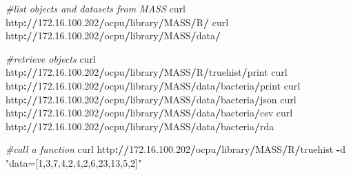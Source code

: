 \documentclass[]{book}
\newenvironment{Shaded}{\begin{snugshade}}{\end{snugshade}}
\newcommand{\FloatTok}[1]{\textcolor[rgb]{0.00,0.00,0.81}{#1}}
\newcommand{\StringTok}[1]{\textcolor[rgb]{0.31,0.60,0.02}{#1}}
\newcommand{\CommentTok}[1]{\textcolor[rgb]{0.56,0.35,0.01}{\textit{#1}}}
\newcommand{\OperatorTok}[1]{\textcolor[rgb]{0.81,0.36,0.00}{\textbf{#1}}}
\newcommand{\ErrorTok}[1]{\textcolor[rgb]{0.64,0.00,0.00}{\textbf{#1}}}
\newcommand{\NormalTok}[1]{#1}
\begin{document}
\begin{Shaded}
\begin{Highlighting}[]
\CommentTok{#list objects and datasets from MASS}
\NormalTok{curl http}\OperatorTok{:}\ErrorTok{//}\FloatTok{172.16}\NormalTok{.}\FloatTok{100.202}\OperatorTok{/}\NormalTok{ocpu}\OperatorTok{/}\NormalTok{library}\OperatorTok{/}\NormalTok{MASS}\OperatorTok{/}\NormalTok{R}\OperatorTok{/}
\NormalTok{curl http}\OperatorTok{:}\ErrorTok{//}\FloatTok{172.16}\NormalTok{.}\FloatTok{100.202}\OperatorTok{/}\NormalTok{ocpu}\OperatorTok{/}\NormalTok{library}\OperatorTok{/}\NormalTok{MASS}\OperatorTok{/}\NormalTok{data}\OperatorTok{/}

\CommentTok{#retrieve objects}
\NormalTok{curl http}\OperatorTok{:}\ErrorTok{//}\FloatTok{172.16}\NormalTok{.}\FloatTok{100.202}\OperatorTok{/}\NormalTok{ocpu}\OperatorTok{/}\NormalTok{library}\OperatorTok{/}\NormalTok{MASS}\OperatorTok{/}\NormalTok{R}\OperatorTok{/}\NormalTok{truehist}\OperatorTok{/}\NormalTok{print}
\NormalTok{curl http}\OperatorTok{:}\ErrorTok{//}\FloatTok{172.16}\NormalTok{.}\FloatTok{100.202}\OperatorTok{/}\NormalTok{ocpu}\OperatorTok{/}\NormalTok{library}\OperatorTok{/}\NormalTok{MASS}\OperatorTok{/}\NormalTok{data}\OperatorTok{/}\NormalTok{bacteria}\OperatorTok{/}\NormalTok{print}
\NormalTok{curl http}\OperatorTok{:}\ErrorTok{//}\FloatTok{172.16}\NormalTok{.}\FloatTok{100.202}\OperatorTok{/}\NormalTok{ocpu}\OperatorTok{/}\NormalTok{library}\OperatorTok{/}\NormalTok{MASS}\OperatorTok{/}\NormalTok{data}\OperatorTok{/}\NormalTok{bacteria}\OperatorTok{/}\NormalTok{json}
\NormalTok{curl http}\OperatorTok{:}\ErrorTok{//}\FloatTok{172.16}\NormalTok{.}\FloatTok{100.202}\OperatorTok{/}\NormalTok{ocpu}\OperatorTok{/}\NormalTok{library}\OperatorTok{/}\NormalTok{MASS}\OperatorTok{/}\NormalTok{data}\OperatorTok{/}\NormalTok{bacteria}\OperatorTok{/}\NormalTok{csv}
\NormalTok{curl http}\OperatorTok{:}\ErrorTok{//}\FloatTok{172.16}\NormalTok{.}\FloatTok{100.202}\OperatorTok{/}\NormalTok{ocpu}\OperatorTok{/}\NormalTok{library}\OperatorTok{/}\NormalTok{MASS}\OperatorTok{/}\NormalTok{data}\OperatorTok{/}\NormalTok{bacteria}\OperatorTok{/}\NormalTok{rda}

\CommentTok{#call a function}
\NormalTok{curl http}\OperatorTok{:}\ErrorTok{//}\FloatTok{172.16}\NormalTok{.}\FloatTok{100.202}\OperatorTok{/}\NormalTok{ocpu}\OperatorTok{/}\NormalTok{library}\OperatorTok{/}\NormalTok{MASS}\OperatorTok{/}\NormalTok{R}\OperatorTok{/}\NormalTok{truehist }\OperatorTok{-}\NormalTok{d }\StringTok{"data=[1,3,7,4,2,4,2,6,23,13,5,2]"}
\end{Highlighting}
\end{Shaded}
\end{document}
